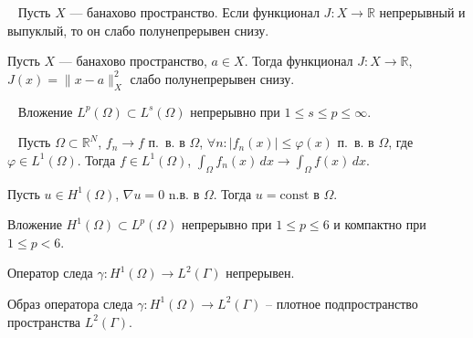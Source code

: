 \begin{lemma}
    \label{lem:weakly_semicontinuous_functional}~\cite[с. 47]{Troeltzsch2010}
    Пусть $X$ — банахово пространство.
    Если функционал $J : X \to \mathbb{R}$ непрерывный и выпуклый,
    то он слабо полунепрерывен снизу.
\end{lemma}

\begin{corollary}
    \label{cor:weakly_semicontinuous_norm}
    Пусть $X$ — банахово пространство, $a \in X$.
    Тогда функционал $J : X \to \mathbb{R}$, $J(x) = \|x - a\|^2_X$
    слабо полунепрерывен снизу.
\end{corollary}

\begin{lemma}
    \label{lem:embedding_Lp_Ls}~\cite[с. 37]{Zeidler1990a}
    Вложение $L^p(\Omega) \subset L^s(\Omega)$ непрерывно при
    $1 \leq s \leq p \leq \infty$.
\end{lemma}

\begin{theorem}[Лебег]
    \label{th:lebeg}~\cite[321]{Kolmogorov2004}
    Пусть $\Omega \subset \mathbb{R}^N$, $f_n \to f$ п.\ в. в $\Omega$,
    $\forall n : |f_n(x)| \leq \varphi(x)$ п.\ в. в $\Omega$,
    где $\varphi \in L^1(\Omega)$.
    Тогда $f \in L^1(\Omega)$, $\int_{\Omega} f_n(x) \, dx \to \int_{\Omega} f(x) \, dx$.
\end{theorem}


\begin{lemma}
    \label{lm:1_7:15}\cite[47]{Ziemer1989}
    Пусть $u \in H^{1}(\Omega)$, $\nabla u = 0$ n.в. в $\Omega$.
    Тогда $u = \text{const} \text{ в } \Omega$.
\end{lemma}

\begin{lemma}
    \label{lm:1_7:embedding}\cite[1026]{Zeidler1990b}
    Вложение $H^{1}(\Omega) \subset L^{p}(\Omega)$ непрерывно
    при $1 \leq p \leq 6$ и компактно при $1 \leq p<6$.
\end{lemma}


\begin{lemma}
    \label{lm:1_7:19}\cite[239]{Zeidler1990a}
    Оператор следа $\gamma: H^{1}(\Omega) \rightarrow L^{2}(\Gamma)$ непрерывен.
\end{lemma}

\begin{lemma}
    \label{lm:1_7:20}\cite[4]{girault1979finite}
    Образ оператора следа $\gamma: H^{1}(\Omega) \rightarrow L^{2}(\Gamma)$
    -- плотное подпространство пространства $L^{2}(\Gamma)$.
\end{lemma}


